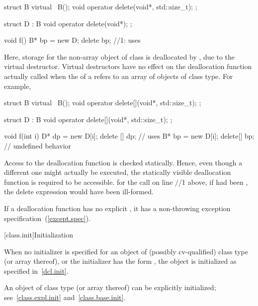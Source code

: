\begin{codeblock}
struct B {
  virtual ~B();
  void operator delete(void*, std::size_t);
};

struct D : B {
  void operator delete(void*);
};

void f() {
  B* bp = new D;
  delete bp;        //1: uses 
}
\end{codeblock}

Here, storage for the non-array object of class
is deallocated by
,
due to the virtual destructor.
\exitnote
\enternote
Virtual destructors have no effect on the deallocation function actually
called when the
of a
refers to an array of objects of class type.
For example,

\begin{codeblock}
struct B {
  virtual ~B();
  void operator delete[](void*, std::size_t);
};

struct D : B {
  void operator delete[](void*, std::size_t);
};

void f(int i) {
  D* dp = new D[i];
  delete [] dp;     // uses 
  B* bp = new D[i];
  delete[] bp;      // undefined behavior
}
\end{codeblock}
\exitnote

\pnum
Access to the deallocation function is checked statically.
Hence, even though a different one might actually be executed,
the statically visible deallocation function is required to be accessible.
\enterexample
for the call on line //1 above,
if
had been
,
the delete expression would have been ill-formed.
\exitexample

\pnum
\enternote
If a deallocation function has no explicit , it
has a non-throwing exception specification~(\ref{except.spec}).
\exitnote

[class.init]{Initialization}%
%
%

\pnum
When no initializer is specified for an object of (possibly
cv-qualified) class type (or array thereof), or the initializer has
the form
\tcode{()},
the object is initialized as specified in~\ref{dcl.init}.

\pnum
An object of class type (or array thereof) can be explicitly initialized;
see~\ref{class.expl.init} and~\ref{class.base.init}.

